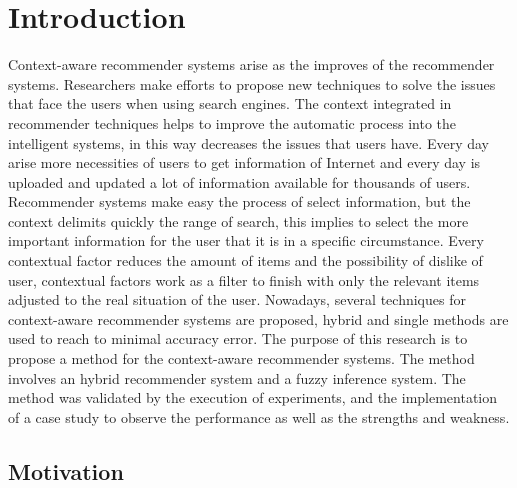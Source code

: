 \chapter{Introduction} \label{introduction} 

Context-aware recommender systems arise as the improves of 
the recommender systems. Researchers make efforts to propose 
new techniques to solve the issues that face the users when using 
search engines. The context integrated in recommender techniques 
helps to improve the automatic process into the intelligent systems, 
in this way decreases the issues that users have.
Every day arise more necessities of users to get information of  
Internet and every day  is uploaded and updated a lot of 
information available for thousands of users.
Recommender systems make easy the process of select information, but
the context delimits quickly the range of search, this implies
to select the more important information for the user that it is 
in a specific circumstance. Every contextual factor reduces the
amount of items and the possibility of dislike of user, 
contextual factors work as a filter to finish with only 
the relevant items adjusted to the real situation of the user.
Nowadays, several techniques for context-aware recommender
systems are proposed, hybrid and single methods are used to
reach to minimal accuracy error. 
The purpose of this research is to propose a method for the
context-aware recommender systems. The method involves an 
hybrid recommender system and a fuzzy inference system. 
The method was validated by the execution of experiments, 
and the implementation of a case study to observe the 
performance as well as the strengths and weakness.

\section{Motivation}

